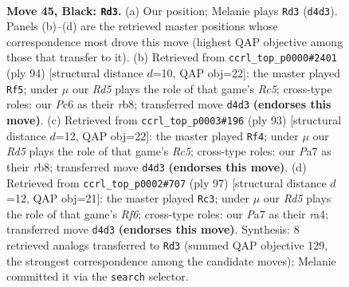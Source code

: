 \documentclass[11pt]{article}
\begin{document}
\clearpage

\begin{figure}[p]\centering
\begin{subfigure}{0.46\textwidth}\centering
\resizebox{\linewidth}{!}{%
\newchessgame
\chessboard[
  setfen={8/p2p4/2p4k/4K3/3r4/7P/5P2/8 b - - 2 45},
  showmover=false,
  pgfstyle=straightmove, color=movearrow, markmove={d4-d3}
]}
\caption{}
\end{subfigure}\hfill
\begin{subfigure}{0.46\textwidth}\centering
\resizebox{\linewidth}{!}{%
\newchessgame
\chessboard[
  setfen={1r6/8/3k1p2/1PR5/8/8/4P1K1/8 w - - 7 48},
  showmover=false,
  pgfstyle=straightmove, color=movearrow, markmove={c5-f5}
]}
\caption{}
\end{subfigure}
\\[4pt]
\begin{subfigure}{0.46\textwidth}\centering
\resizebox{\linewidth}{!}{%
\newchessgame
\chessboard[
  setfen={1R6/8/8/5k2/1pr4p/3K4/1P3P2/8 b - - 1 47},
  showmover=false,
  pgfstyle=straightmove, color=movearrow, markmove={c4-f4}
]}
\caption{}
\end{subfigure}\hfill
\begin{subfigure}{0.46\textwidth}\centering
\resizebox{\linewidth}{!}{%
\newchessgame
\chessboard[
  setfen={8/5k2/8/7p/R4p1P/5r2/6K1/8 b - - 1 49},
  showmover=false,
  pgfstyle=straightmove, color=movearrow, markmove={f3-c3}
]}
\caption{}
\end{subfigure}
\caption{\textbf{Move 45, Black: \texttt{Rd3}.} (a) Our position; Melanie plays \texttt{Rd3} (\texttt{d4d3}). Panels (b)--(d) are the retrieved master positions whose correspondence most drove this move (highest QAP objective among those that transfer to it). (b) Retrieved from \texttt{ccrl\_top\_p0000\#2401} (ply 94) [structural distance $d$=10, QAP obj=22]: the master played \texttt{Rf5}; under $\mu$ our \emph{Rd5} plays the role of that game's \emph{Rc5}; cross-type roles: our \emph{P}c6 as their \emph{r}b8; transferred move \texttt{d4d3} \textbf{(endorses this move)}. (c) Retrieved from \texttt{ccrl\_top\_p0003\#196} (ply 93) [structural distance $d$=12, QAP obj=22]: the master played \texttt{Rf4}; under $\mu$ our \emph{Rd5} plays the role of that game's \emph{Rc5}; cross-type roles: our \emph{P}a7 as their \emph{r}b8; transferred move \texttt{d4d3} \textbf{(endorses this move)}. (d) Retrieved from \texttt{ccrl\_top\_p0002\#707} (ply 97) [structural distance $d$=12, QAP obj=21]: the master played \texttt{Rc3}; under $\mu$ our \emph{Rd5} plays the role of that game's \emph{Rf6}; cross-type roles: our \emph{P}a7 as their \emph{r}a4; transferred move \texttt{d4d3} \textbf{(endorses this move)}. Synthesis: 8 retrieved analogs transferred to \texttt{Rd3} (summed QAP objective 129, the strongest correspondence among the candidate moves); Melanie committed it via the \texttt{search} selector.}
\label{fig:thought-m89}
\end{figure}
\end{document}
